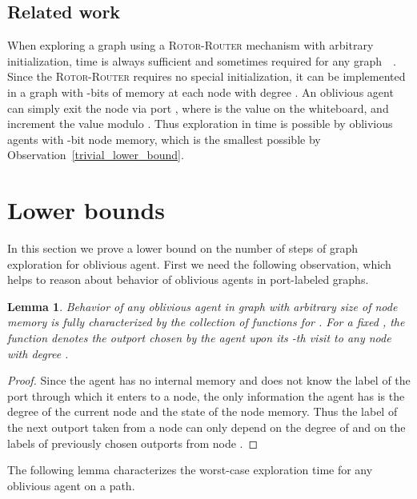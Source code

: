 \documentclass{article}[11pt,letter]
\newtheorem{lemma}[definition]{Lemma}
\newtheorem{lemma}[definition]{Lemma}
\newcommand{\RR}{{\textsc{Rotor-Router}}\xspace}
\begin{document}
\subsection{Related work}


When exploring a graph using a \RR mechanism with arbitrary initialization, time  is always sufficient and sometimes required for any graph~\cite{Yanovski}~\cite{LockIn}. Since the \RR requires no special initialization, it can be implemented in a graph with -bits of memory at each node with degree . An oblivious agent can simply exit the node  via port , where  is the value on the whiteboard, and increment the value  modulo . Thus exploration in time  is possible by oblivious agents with -bit node memory, which is the smallest possible by Observation~\ref{trivial_lower_bound}.



\section{Lower bounds}
\label{sec:lower}
In this section we prove a lower bound on the number of steps of graph exploration for oblivious agent. First we need the following observation, which helps to reason about behavior of oblivious agents in port-labeled graphs.

\begin{lemma}
\label{lem:behaviour}
Behavior of any oblivious agent  in graph  with arbitrary size of node memory is fully characterized by the collection of functions  for . For a fixed , the function denotes the outport chosen by the agent upon its -th visit to any node with degree .
\end{lemma}
\begin{proof}
Since the agent has no internal memory and does not know the label of the port through which it enters to a node, the only information the agent has is the degree of the current node and the state of the node memory. Thus the label of the next outport taken from a node  can only depend on the degree of  and on the labels of previously chosen outports from node . \end{proof}


The following lemma characterizes the worst-case exploration time for any oblivious agent on a path.
\end{document}
